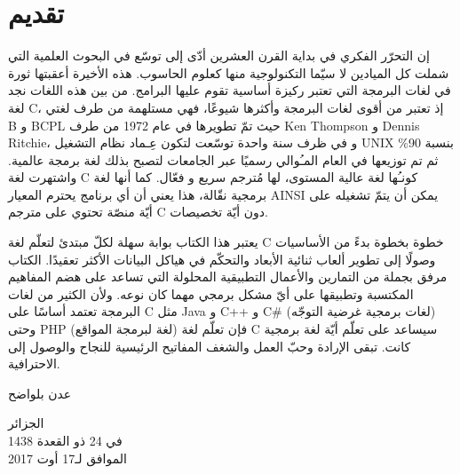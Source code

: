 \chapter*{تقديم}
إن التحرّر الفكري في بداية القرن العشرين أدّى إلى توسّع في البحوث العلمية التي شملت كل الميادين لا سيّما التكنولوجية منها كعلوم الحاسوب. هذه الأخيرة أعقبتها ثورة في لغات البرمجة التي تعتبر ركيزة أساسية تقوم عليها البرامج. من بين هذه اللغات نجد لغة \textenglish{C}،
إذ تعتبر من أقوى لغات البرمجة وأكثرها شيوعًا، فهي مستلهمة من طرف لغتي
 \textenglish{B}
 و
 \textenglish{BCPL}
حيث تمّ تطويرها في عام 1972 من طرف
\textenglish{Ken Thompson}
و
 \textenglish{Dennis Ritchie}،
و في ظرف سنة واحدة توسّعت لتكون عِـماد نظام التشغيل
\textenglish{UNIX}
بنسبة
90\%
ثم تم توزيعها في العام المـُوالي رسميًا عبر الجامعات لتصبح بذلك لغة برمجة عالمية. واشتهرت لغة \textenglish{C}
 كونـُها لغة عالية المستوى، لها مُترجم سريع و فعّال. كما أنها لغة برمجية نقّالة، هذا يعني أن أي برنامج يحترم المعيار
\textenglish{AINSI}
يمكن أن يتمّ تشغيله على أيّة منصّة تحتوي على مترجم
\textenglish{C}
 دون أيّة تخصيصات.

يعتبر هذا الكتاب بوابة سهلة لكلّ مبتدئ لتعلّم لغة \textenglish{C}
خطوة بخطوة بدءً من الأساسيات وصولًا إلى تطوير ألعاب ثنائية الأبعاد والتحكّم في هياكل البيانات الأكثر تعقيدًا. الكتاب مرفق بجملة من التمارين والأعمال التطبيقية المحلولة التي تساعد على هضم المفاهيم المكتسبة وتطبيقها على أيّ مشكل برمجي مهما كان نوعه. ولأن الكثير من لغات البرمجة تعتمد أساسًا على \textenglish{C}
مثل \textenglish{Java}
و \textenglish{C++}
و \textenglish{C\#}
(لغات برمجية غرضية التوجّه) وحتى
\textenglish{PHP}
(لغة لبرمجة المواقع) فإن تعلّم لغة \textenglish{C}
 سيساعد على تعلّم أيّة لغة برمجية كانت. تبقى الإرادة وحبّ العمل والشغف المفاتيح الرئيسية للنجاح والوصول إلى الاحترافية.

\vfill

\hfill\parbox{0.3\textwidth}{\centering
عدن بلواضح

\vspace{1em}
الجزائر\\[0.5em]
في
24 ذو القعدة 1438\\[0.3em]
الموافق لـ17 أوت 2017

}

